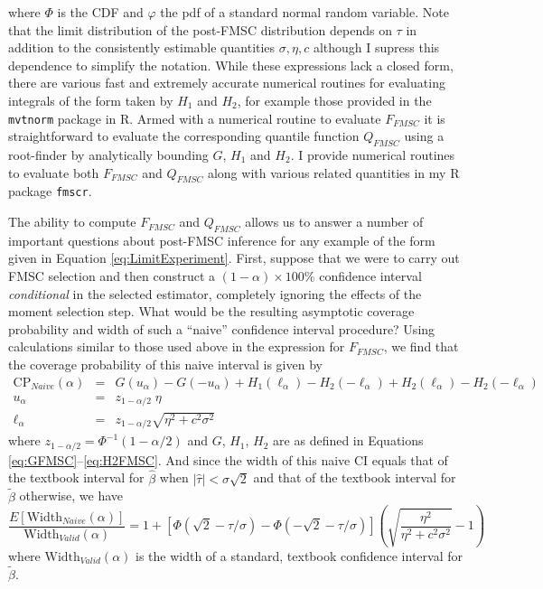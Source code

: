 \documentclass[12pt,letterpaper]{article}
\begin{document}
where $\Phi$ is the CDF and $\varphi$ the pdf of a standard normal random variable.
Note that the limit distribution of the post-FMSC distribution depends on $\tau$ in addition to the consistently estimable quantities $\sigma, \eta, c$ although I supress this dependence to simplify the notation.
While these expressions lack a closed form, there are various fast and extremely accurate numerical routines for evaluating integrals of the form taken by $H_1$ and $H_2$, for example those provided in the \texttt{mvtnorm} package in R. 
Armed with a numerical routine to evaluate $F_{FMSC}$ it is straightforward to evaluate the corresponding quantile function $Q_{FMSC}$ using a root-finder by analytically bounding $G$, $H_1$ and $H_2$.
I provide numerical routines to evaluate both $F_{FMSC}$ and $Q_{FMSC}$ along with various related quantities in my R package \texttt{fmscr}. 

The ability to compute $F_{FMSC}$ and $Q_{FMSC}$ allows us to answer a number of important questions about post-FMSC inference for any example of the form given in Equation \ref{eq:LimitExperiment}.
First, suppose that we were to carry out FMSC selection and then construct a $(1 - \alpha) \times 100\%$ confidence interval \emph{conditional} in the selected estimator, completely ignoring the effects of the moment selection step.
What would be the resulting asymptotic coverage probability and width of such a ``naive'' confidence interval procedure?
Using calculations similar to those used above in the expression for $F_{FMSC}$, we find that the coverage probability of this naive interval is given by
\begin{eqnarray*}
  \mbox{CP}_{Naive}(\alpha) &=& G(u_\alpha) - G(-u_\alpha) +  H_1(\ell_\alpha) - H_2(-\ell_\alpha) +  H_2(\ell_\alpha) - H_2(-\ell_\alpha) \\
  u_\alpha &=& z_{1-\alpha/2}\; \eta\\
  \ell_{\alpha} &=& z_{1-\alpha/2} \sqrt{\eta^2 + c^2\sigma^2}
\end{eqnarray*}
where $z_{1-\alpha/2} = \Phi^{-1}(1 -\alpha/2)$ and $G$, $H_1$, $H_2$ are as defined in Equations \ref{eq:GFMSC}--\ref{eq:H2FMSC}.
And since the width of this naive CI equals that of the textbook interval for $\widehat{\beta}$ when $|\widehat{\tau}|<\sigma\sqrt{2}$ and that of the textbook interval for $\widetilde{\beta}$ otherwise, we have
\begin{equation*}
  \frac{E\left[ \mbox{Width}_{Naive}(\alpha) \right]}{\mbox{Width}_{Valid}(\alpha)} = 1 + \left[ \Phi( \sqrt{2} - \tau/\sigma) -  \Phi( -\sqrt{2} - \tau/\sigma )\right]\left( \sqrt{\frac{\eta^2}{\eta^2 + c^2 \sigma^2}} - 1 \right)
\end{equation*}
where $\mbox{Width}_{Valid}(\alpha)$ is the width of a standard, textbook confidence interval for $\widetilde{\beta}$.
\end{document}
